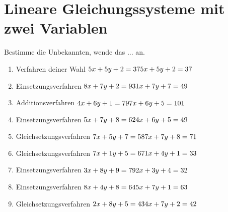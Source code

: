 \documentclass{article}%
\begin{document}
%
\section{Lineare Gleichungssysteme mit zwei Variablen}%
\label{sec:LineareGleichungssystememitzweiVariablen}%
Bestimme die Unbekannten, wende das ... an.%
\begin{enumerate}[label=\alph*)]%
\item%
Verfahren deiner Wahl \newline\vspace{0.5cm} $5x+5y+2=37\newline5x+5y+2=37\newline$%
\item%
Einsetzungsverfahren \newline\vspace{0.5cm} $8x+7y+2=93\newline1x+7y+7=49\newline$%
\item%
Additionsverfahren \newline\vspace{0.5cm} $4x+6y+1=79\newline7x+6y+5=101\newline$%
\item%
Einsetzungsverfahren \newline\vspace{0.5cm} $5x+7y+8=62\newline4x+6y+5=49\newline$%
\item%
Gleichsetzungsverfahren \newline\vspace{0.5cm} $7x+5y+7=58\newline7x+7y+8=71\newline$%
\item%
Gleichsetzungsverfahren \newline\vspace{0.5cm} $7x+1y+5=67\newline1x+4y+1=33\newline$%
\item%
Einsetzungsverfahren \newline\vspace{0.5cm} $3x+8y+9=79\newline2x+3y+4=32\newline$%
\item%
Einsetzungsverfahren \newline\vspace{0.5cm} $8x+4y+8=64\newline5x+7y+1=63\newline$%
\item%
Gleichsetzungsverfahren \newline\vspace{0.5cm} $2x+8y+5=43\newline4x+7y+2=42\newline$%

\end{enumerate}
\end{document}
